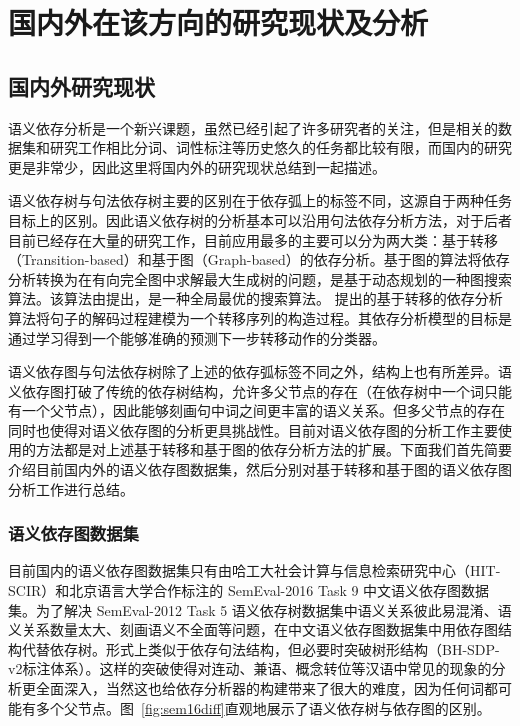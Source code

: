 
\section{国内外在该方向的研究现状及分析}
\subsection{国内外研究现状}

语义依存分析是一个新兴课题，虽然已经引起了许多研究者的关注，但是相关的数据集和研究工作相比分词、词性标注等历史悠久的任务都比较有限，而国内的研究更是非常少，因此这里将国内外的研究现状总结到一起描述。

语义依存树与句法依存树主要的区别在于依存弧上的标签不同，这源自于两种任务目标上的区别。因此语义依存树的分析基本可以沿用句法依存分析方法，对于后者目前已经存在大量的研究工作，目前应用最多的主要可以分为两大类：基于转移（Transition-based）和基于图（Graph-based）的依存分析。基于图的算法将依存分析转换为在有向完全图中求解最大生成树的问题，是基于动态规划的一种图搜索算法。该算法由提出，是一种全局最优的搜索算法。 提出的基于转移的依存分析算法将句子的解码过程建模为一个转移序列的构造过程。其依存分析模型的目标是通过学习得到一个能够准确的预测下一步转移动作的分类器。

语义依存图与句法依存树除了上述的依存弧标签不同之外，结构上也有所差异。语义依存图打破了传统的依存树结构，允许多父节点的存在（在依存树中一个词只能有一个父节点），因此能够刻画句中词之间更丰富的语义关系。但多父节点的存在同时也使得对语义依存图的分析更具挑战性。目前对语义依存图的分析工作主要使用的方法都是对上述基于转移和基于图的依存分析方法的扩展。下面我们首先简要介绍目前国内外的语义依存图数据集，然后分别对基于转移和基于图的语义依存图分析工作进行总结。

\subsubsection{语义依存图数据集}

目前国内的语义依存图数据集只有由哈工大社会计算与信息检索研究中心（HIT-SCIR）和北京语言大学合作标注的 SemEval-2016 Task 9 中文语义依存图数据集。为了解决 SemEval-2012 Task 5 语义依存树数据集中语义关系彼此易混淆、语义关系数量太大、刻画语义不全面等问题，在中文语义依存图数据集中用依存图结构代替依存树。形式上类似于依存句法结构，但必要时突破树形结构（BH-SDP-v2标注体系）。这样的突破使得对连动、兼语、概念转位等汉语中常见的现象的分析更全面深入，当然这也给依存分析器的构建带来了很大的难度，因为任何词都可能有多个父节点。图~\ref{fig:sem16diff}直观地展示了语义依存树与依存图的区别。

